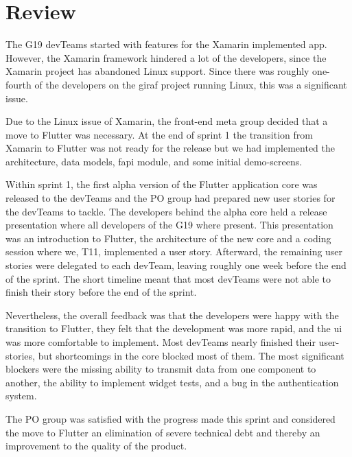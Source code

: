 \section{Review}

The \gls{G19} \glspl{devTeam} started with features for the Xamarin implemented app. However, the Xamarin framework hindered a lot of the developers, since the Xamarin project has abandoned Linux support. Since there was roughly one-fourth of the developers on the \gls{giraf} project running Linux, this was a significant issue.

Due to the Linux issue of Xamarin, the front-end meta group decided that a move to Flutter was necessary. At the end of sprint 1 the transition from Xamarin to Flutter was not ready for the release but we had implemented the architecture, data models, \gls{fapi} module, and some initial demo-screens.

Within sprint 1, the first alpha version of the Flutter application core was released to the \glspl{devTeam} and the \gls{PO} group had prepared new user stories for the \glspl{devTeam} to tackle. The developers behind the alpha core held a release presentation where all developers of the \gls{G19} where present. This presentation was an introduction to Flutter, the architecture of the new core and a coding session where we, \gls{T11}, implemented a user story. Afterward, the remaining user stories were delegated to each \gls{devTeam}, leaving roughly one week before the end of the sprint. The short timeline meant that most \glspl{devTeam} were not able to finish their story before the end of the sprint.

Nevertheless, the overall feedback was that the developers were happy with the transition to Flutter, they felt that the development was more rapid, and the \gls{ui} was more comfortable to implement. Most \glspl{devTeam} nearly finished their user-stories, but shortcomings in the core blocked most of them. The most significant blockers were the missing ability to transmit data from one component to another, the ability to implement widget tests, and a bug in the authentication system.

The \gls{PO} group was satisfied with the progress made this sprint and considered the move to Flutter an elimination of severe technical debt and thereby an improvement to the quality of the product.
